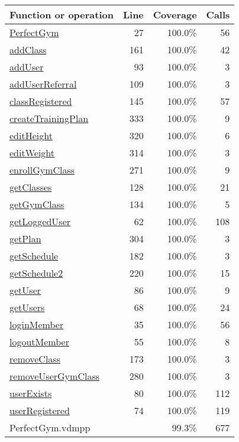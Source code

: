 \begin{longtable}{|l|r|r|r|}
\hline
Function or operation & Line & Coverage & Calls \\
\hline
\hline
\hyperref[PerfectGym:27]{PerfectGym} & 27&100.0\% & 56 \\
\hline
\hyperref[addClass:161]{addClass} & 161&100.0\% & 42 \\
\hline
\hyperref[addUser:93]{addUser} & 93&100.0\% & 3 \\
\hline
\hyperref[addUserReferral:109]{addUserReferral} & 109&100.0\% & 3 \\
\hline
\hyperref[classRegistered:145]{classRegistered} & 145&100.0\% & 57 \\
\hline
\hyperref[createTrainingPlan:333]{createTrainingPlan} & 333&100.0\% & 9 \\
\hline
\hyperref[editHeight:320]{editHeight} & 320&100.0\% & 6 \\
\hline
\hyperref[editWeight:314]{editWeight} & 314&100.0\% & 3 \\
\hline
\hyperref[enrollGymClass:271]{enrollGymClass} & 271&100.0\% & 9 \\
\hline
\hyperref[getClasses:128]{getClasses} & 128&100.0\% & 21 \\
\hline
\hyperref[getGymClass:134]{getGymClass} & 134&100.0\% & 5 \\
\hline
\hyperref[getLoggedUser:62]{getLoggedUser} & 62&100.0\% & 108 \\
\hline
\hyperref[getPlan:304]{getPlan} & 304&100.0\% & 3 \\
\hline
\hyperref[getSchedule:182]{getSchedule} & 182&100.0\% & 3 \\
\hline
\hyperref[getSchedule2:220]{getSchedule2} & 220&100.0\% & 15 \\
\hline
\hyperref[getUser:86]{getUser} & 86&100.0\% & 9 \\
\hline
\hyperref[getUsers:68]{getUsers} & 68&100.0\% & 24 \\
\hline
\hyperref[loginMember:35]{loginMember} & 35&100.0\% & 56 \\
\hline
\hyperref[logoutMember:55]{logoutMember} & 55&100.0\% & 8 \\
\hline
\hyperref[removeClass:173]{removeClass} & 173&100.0\% & 3 \\
\hline
\hyperref[removeUserGymClass:280]{removeUserGymClass} & 280&100.0\% & 3 \\
\hline
\hyperref[userExists:80]{userExists} & 80&100.0\% & 112 \\
\hline
\hyperref[userRegistered:74]{userRegistered} & 74&100.0\% & 119 \\
\hline
\hline
PerfectGym.vdmpp & & 99.3\% & 677 \\
\hline
\end{longtable}

